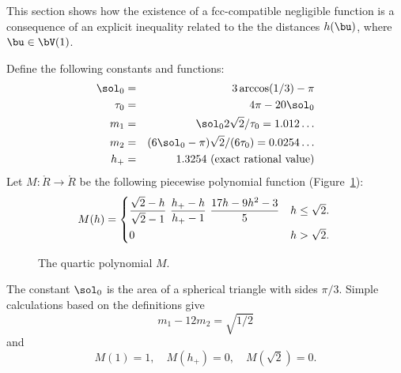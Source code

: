 This section shows how the existence of a fcc-compatible negligible
function is a consequence of an explicit
inequality related to the the distances $h(\bu)$, where $\bu\in \bV(1)$.



\begin{definition} 
%
%
%
%
%
%
Define the following constants and functions: 
\begin{eqnarray}\label{eqn:m-def} 
\sol_0 &=& 3\arccos(1/3)-\pi\\
\tau_0 &=& 4\pi  - 20\sol_0\\
m_1 &=& \sol_0 2\sqrt2/\tau_0 = 1.012\ldots \\ %
m_2  &=&  (6\sol_0- \pi)\sqrt2/(6 \tau_0) = 0.0254\ldots\\ %
h_+ &=& 1.3254 \hbox{~(exact rational value)}
\end{eqnarray}
Let $M:\ring{R}\to\ring{R}$ 
be the following piecewise polynomial function (Figure~\ref{fig:M}):
\begin{equation}\label{eqn:M} 
M(h) =
\begin{cases} 
\dfrac{\sqrt2-h}{\sqrt2-1}~ \dfrac{h_+-h}{h_+-1} ~\dfrac{17 h - 9 h^2 - 3}{5} 
& h \le \sqrt2.\vspace{3pt} \\
0 & h >\sqrt2.
\end{cases}
\\
\end{equation}
\end{definition}

\begin{figure}[htb]
\centering
{}
\caption{The quartic polynomial $M$.}
\label{fig:M}
\end{figure}

The constant $\sol_0$
is the area of a spherical triangle with sides $\pi/3$.
Simple calculations based on the definitions give
\begin{equation}\label{eqn:km}m_1 - 12m_2 = \sqrt{1/2}\end{equation} 
and
\begin{equation}M(1) = 1,\quad M(h_+)=0,\quad M(\sqrt2) =0.\end{equation} 


